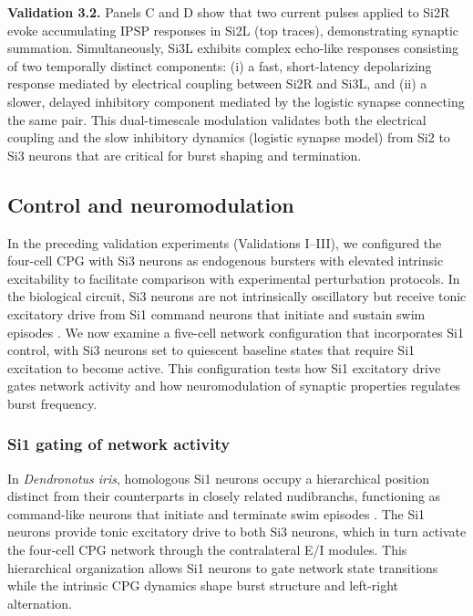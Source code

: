 \documentclass[nofootinbib,aip,amsmath,amssymb,preprint,twocolumn,floatfix,10pt]{revtex4-2}
\begin{document}
{\bf Validation 3.2.}
Panels C and D show that two current pulses applied to Si2R evoke accumulating IPSP responses in Si2L (top traces), demonstrating synaptic summation. Simultaneously, Si3L exhibits complex echo-like responses consisting of two temporally distinct components: (i) a fast, short-latency depolarizing response mediated by electrical coupling between Si2R and Si3L, and (ii) a slower, delayed inhibitory component mediated by the logistic synapse connecting the same pair. This dual-timescale modulation validates both the electrical coupling and the slow inhibitory dynamics (logistic synapse model) from Si2 to Si3 neurons that are critical for burst shaping and termination.


\subsection{Control and neuromodulation}

In the preceding validation experiments (Validations I--III), we configured the four-cell CPG with Si3 neurons as endogenous bursters with elevated intrinsic excitability to facilitate comparison with experimental perturbation protocols. In the biological circuit, Si3 neurons are not intrinsically oscillatory but receive tonic excitatory drive from Si1 command neurons that initiate and sustain swim episodes \cite{sakurai2019command}. We now examine a five-cell network configuration that incorporates Si1 control, with Si3 neurons set to quiescent baseline states that require Si1 excitation to become active. This configuration tests how Si1 excitatory drive gates network activity and how neuromodulation of synaptic properties regulates burst frequency.

\subsubsection{Si1 gating of network activity}

In \textit{Dendronotus iris}, homologous Si1 neurons occupy a hierarchical position distinct from their counterparts in closely related nudibranchs, functioning as command-like neurons that initiate and terminate swim episodes \cite{sakurai2019command}. The Si1 neurons provide tonic excitatory drive to both Si3 neurons, which in turn activate the four-cell CPG network through the contralateral E/I modules. This hierarchical organization allows Si1 neurons to gate network state transitions while the intrinsic CPG dynamics shape burst structure and left-right alternation.
\end{document}
